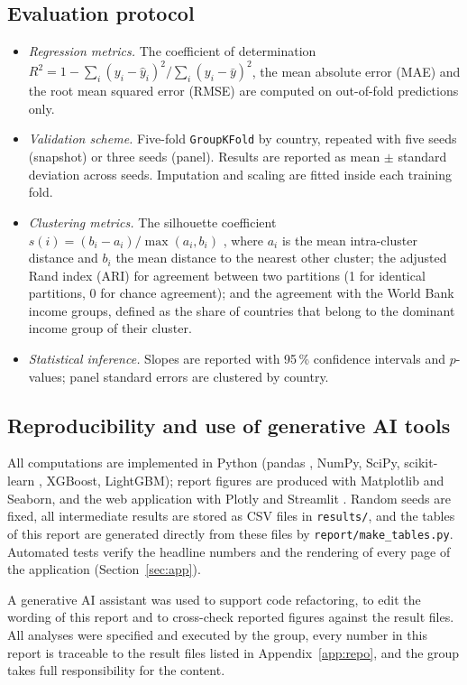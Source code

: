 \documentclass[11pt,a4paper]{article}
\begin{document}
\subsection{Evaluation protocol}
\begin{itemize}
\item \emph{Regression metrics.} The coefficient of determination $R^2 = 1 - \sum_i(y_i-\hat y_i)^2 / \sum_i(y_i-\bar y)^2$, the mean absolute error (MAE) and the root mean squared error (RMSE) are computed on out-of-fold predictions only.
\item \emph{Validation scheme.} Five-fold \texttt{GroupKFold} by country, repeated with five seeds (snapshot) or three seeds (panel). Results are reported as mean $\pm$ standard deviation across seeds. Imputation and scaling are fitted inside each training fold.
\item \emph{Clustering metrics.} The silhouette coefficient $s(i) = (b_i - a_i)/\max(a_i, b_i)$ \cite{rousseeuw}, where $a_i$ is the mean intra-cluster distance and $b_i$ the mean distance to the nearest other cluster; the adjusted Rand index (ARI) \cite{hubert} for agreement between two partitions (1 for identical partitions, 0 for chance agreement); and the agreement with the World Bank income groups, defined as the share of countries that belong to the dominant income group of their cluster.
\item \emph{Statistical inference.} Slopes are reported with 95\,\% confidence intervals and $p$-values; panel standard errors are clustered by country.
\end{itemize}

\subsection{Reproducibility and use of generative AI tools}
All computations are implemented in Python (pandas \cite{pandas}, NumPy, SciPy, scikit-learn \cite{sklearn}, XGBoost, LightGBM); report figures are produced with Matplotlib and Seaborn, and the web application with Plotly and Streamlit \cite{streamlit}. Random seeds are fixed, all intermediate results are stored as CSV files in \texttt{results/}, and the tables of this report are generated directly from these files by \texttt{report/make\_tables.py}. Automated tests verify the headline numbers and the rendering of every page of the application (Section~\ref{sec:app}).

A generative AI assistant was used to support code refactoring, to edit the wording of this report and to cross-check reported figures against the result files. All analyses were specified and executed by the group, every number in this report is traceable to the result files listed in Appendix~\ref{app:repo}, and the group takes full responsibility for the content.
\end{document}
